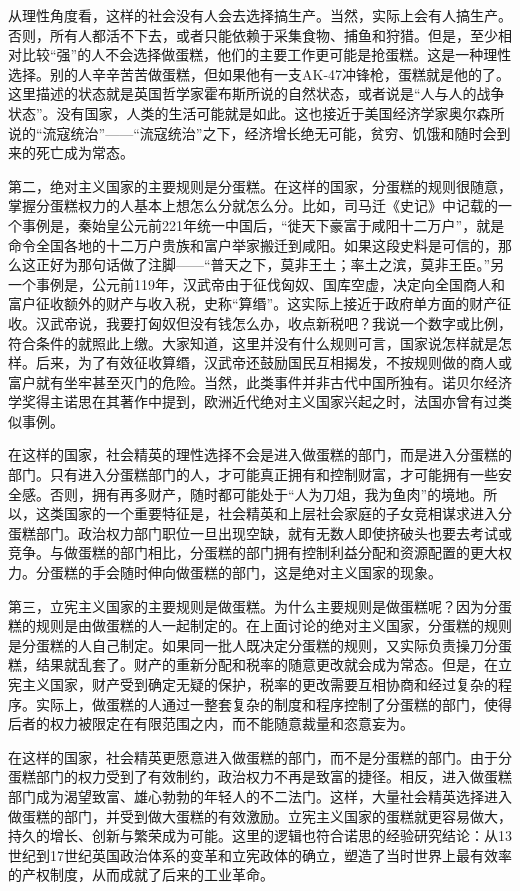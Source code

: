 从理性角度看，这样的社会没有人会去选择搞生产。当然，实际上会有人搞生产。否则，所有人都活不下去，或者只能依赖于采集食物、捕鱼和狩猎。但是，至少相对比较“强”的人不会选择做蛋糕，他们的主要工作更可能是抢蛋糕。这是一种理性选择。别的人辛辛苦苦做蛋糕，但如果他有一支AK-47冲锋枪，蛋糕就是他的了。这里描述的状态就是英国哲学家霍布斯所说的自然状态，或者说是“人与人的战争状态”。没有国家，人类的生活可能就是如此。这也接近于美国经济学家奥尔森所说的“流寇统治”——“流寇统治”之下，经济增长绝无可能，贫穷、饥饿和随时会到来的死亡成为常态。

第二，绝对主义国家的主要规则是分蛋糕。在这样的国家，分蛋糕的规则很随意，掌握分蛋糕权力的人基本上想怎么分就怎么分。比如，司马迁《史记》中记载的一个事例是，秦始皇公元前221年统一中国后，“徙天下豪富于咸阳十二万户”，就是命令全国各地的十二万户贵族和富户举家搬迁到咸阳。如果这段史料是可信的，那么这正好为那句话做了注脚——“普天之下，莫非王土；率土之滨，莫非王臣。”另一个事例是，公元前119年，汉武帝由于征伐匈奴、国库空虚，决定向全国商人和富户征收额外的财产与收入税，史称“算缗”。这实际上接近于政府单方面的财产征收。汉武帝说，我要打匈奴但没有钱怎么办，收点新税吧？我说一个数字或比例，符合条件的就照此上缴。大家知道，这里并没有什么规则可言，国家说怎样就是怎样。后来，为了有效征收算缗，汉武帝还鼓励国民互相揭发，不按规则做的商人或富户就有坐牢甚至灭门的危险。当然，此类事件并非古代中国所独有。诺贝尔经济学奖得主诺思在其著作中提到，欧洲近代绝对主义国家兴起之时，法国亦曾有过类似事例。

在这样的国家，社会精英的理性选择不会是进入做蛋糕的部门，而是进入分蛋糕的部门。只有进入分蛋糕部门的人，才可能真正拥有和控制财富，才可能拥有一些安全感。否则，拥有再多财产，随时都可能处于“人为刀俎，我为鱼肉”的境地。所以，这类国家的一个重要特征是，社会精英和上层社会家庭的子女竞相谋求进入分蛋糕部门。政治权力部门职位一旦出现空缺，就有无数人即使挤破头也要去考试或竞争。与做蛋糕的部门相比，分蛋糕的部门拥有控制利益分配和资源配置的更大权力。分蛋糕的手会随时伸向做蛋糕的部门，这是绝对主义国家的现象。

第三，立宪主义国家的主要规则是做蛋糕。为什么主要规则是做蛋糕呢？因为分蛋糕的规则是由做蛋糕的人一起制定的。在上面讨论的绝对主义国家，分蛋糕的规则是分蛋糕的人自己制定。如果同一批人既决定分蛋糕的规则，又实际负责操刀分蛋糕，结果就乱套了。财产的重新分配和税率的随意更改就会成为常态。但是，在立宪主义国家，财产受到确定无疑的保护，税率的更改需要互相协商和经过复杂的程序。实际上，做蛋糕的人通过一整套复杂的制度和程序控制了分蛋糕的部门，使得后者的权力被限定在有限范围之内，而不能随意裁量和恣意妄为。

在这样的国家，社会精英更愿意进入做蛋糕的部门，而不是分蛋糕的部门。由于分蛋糕部门的权力受到了有效制约，政治权力不再是致富的捷径。相反，进入做蛋糕部门成为渴望致富、雄心勃勃的年轻人的不二法门。这样，大量社会精英选择进入做蛋糕的部门，并受到做大蛋糕的有效激励。立宪主义国家的蛋糕就更容易做大，持久的增长、创新与繁荣成为可能。这里的逻辑也符合诺思的经验研究结论：从13世纪到17世纪英国政治体系的变革和立宪政体的确立，塑造了当时世界上最有效率的产权制度，从而成就了后来的工业革命。

